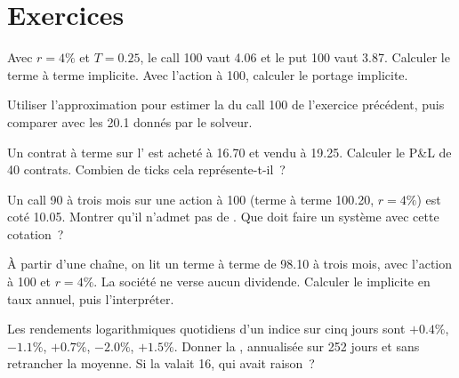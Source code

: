 \section{Exercices}

\begin{exercise}[$\star$]\label{exo:m1:volatility-first-contact:1}
Avec $r = 4\%$ et $T = 0.25$, le call 100 vaut 4.06 et le put 100 vaut 3.87.
Calculer le terme à terme implicite. Avec l'action à 100, calculer le portage implicite.
\end{exercise}

\begin{exercise}[$\star$]\label{exo:m1:volatility-first-contact:2}
Utiliser l'approximation  pour estimer la  du call 100 de
l'exercice précédent, puis comparer avec les 20.1 donnés par le solveur.
\end{exercise}

\begin{exercise}[$\star$]\label{exo:m1:volatility-first-contact:3}
Un contrat à terme sur l' est acheté à 16.70 et vendu à 19.25.
Calculer le P\&L de 40 contrats. Combien de ticks cela représente-t-il~?
\end{exercise}

\begin{exercise}[$\star\star$]\label{exo:m1:volatility-first-contact:4}
Un call 90 à trois mois sur une action à 100 (terme à terme 100.20, $r = 4\%$) est coté
10.05. Montrer qu'il n'admet pas de . Que doit faire un système avec
cette cotation~?
\end{exercise}

\begin{exercise}[$\star\star$]\label{exo:m1:volatility-first-contact:5}
À partir d'une chaîne, on lit un terme à terme de 98.10 à trois mois, avec l'action à 100
et $r = 4\%$. La société ne verse aucun dividende. Calculer le  implicite
en taux annuel, puis l'interpréter.
\end{exercise}

\begin{exercise}[$\star\star$]\label{exo:m1:volatility-first-contact:6}
Les rendements logarithmiques quotidiens d'un indice sur cinq jours sont $+0.4\%$, $-1.1\%$, $+0.7\%$,
$-2.0\%$, $+1.5\%$. Donner la , annualisée sur 252 jours et
sans retrancher la moyenne. Si la  valait 16, qui avait raison~?
\end{exercise}

